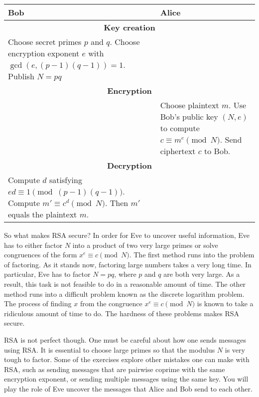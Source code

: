 \documentclass{article}
\theoremstyle{definition}
\theoremstyle{remark}
\begin{document}
    \begin{table}[h!]
        \centering
        \begin{tabular}{|p{5cm}|p{5cm}|}
            \hline
            \textbf{Bob} & \textbf{Alice}\\
            \hline\hline
            \multicolumn{2}{|c|}{\bf Key creation}\\
            \hline
            Choose secret primes \(p\) and \(q\).
            Choose encryption exponent \(e\) with \(\gcd(e,(p-1)(q-1))=1\).
            Publish \(N=pq\) &\\
            \hline
            \multicolumn{2}{|c|}{\bf Encryption}\\
            \hline
            & Choose plaintext \(m\).
            Use Bob's public key \((N,e)\) to compute \(c\equiv m^e\pmod{N}\).
            Send ciphertext \(c\) to Bob.\\
            \hline
            \multicolumn{2}{|c|}{\bf Decryption}\\
            \hline
            Compute \(d\) satisfying \(ed\equiv 1\pmod{(p-1)(q-1)}\).
            Compute \(m' \equiv c^d\pmod{N}\).
            Then \(m'\) equals the plaintext \(m\).&\\
            \hline
        \end{tabular}
    \end{table}

    So what makes RSA secure?
    In order for Eve to uncover useful information, Eve has to either factor \(N\) into a product of two very large primes or solve congruences of the form \(x^e\equiv c\pmod{N}\).
    The first method runs into the problem of factoring.
    As it stands now, factoring large numbers takes a very long time.
    In particular, Eve has to factor \(N=pq\), where \(p\) and \(q\) are both very large.
    As a result, this task is not feasible to do in a reasonable amount of time.
    The other method runs into a difficult problem known as the discrete logarithm problem.
    The process of finding \(x\) from the congruence \(x^e\equiv c\pmod{N}\) is known to take a ridiculous amount of time to do.
    The hardness of these problems makes RSA secure.

    RSA is not perfect though.
    One must be careful about how one sends messages using RSA.
    It is essential to choose large primes so that the modulus \(N\) is very tough to factor.
    Some of the exercises explore other mistakes one can make with RSA, such as sending messages that are pairwise coprime with the same encryption exponent, or sending multiple messages using the same key.
    You will play the role of Eve uncover the messages that Alice and Bob send to each other.
\end{document}
